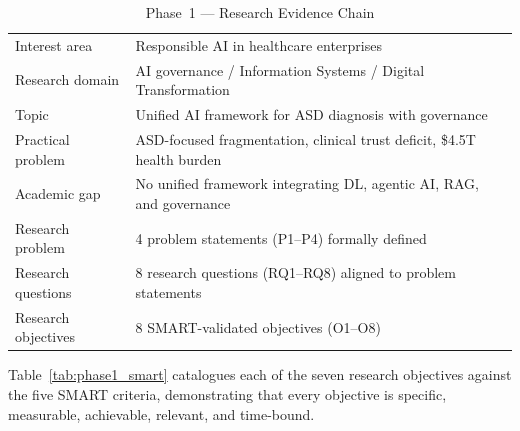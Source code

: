 \begingroup\singlespacing\tablefontsize\tablestripes
\begin{xltabular}{\textwidth}{@{} p{3.2cm} X @{}}
\caption{Phase~1 --- Research Evidence Chain}
\label{tab:phase1_evidence}\\
\toprule
{} &  \\
\midrule
\endfirsthead
\endhead
\bottomrule
\endlastfoot
Interest area            & Responsible AI in healthcare enterprises \\
\addlinespace
Research domain          & AI governance / Information Systems / Digital Transformation \\
\addlinespace
Topic                    & Unified AI framework for ASD diagnosis with governance \\
\addlinespace
Practical problem        & ASD-focused fragmentation, clinical trust deficit, \$4.5T health burden \\
\addlinespace
Academic gap             & No unified framework integrating DL, agentic AI, RAG, and governance \\
\addlinespace
Research problem         & 4 problem statements (P1--P4) formally defined \\
\addlinespace
Research questions       & 8 research questions (RQ1--RQ8) aligned to problem statements \\
\addlinespace
Research objectives      & 8 SMART-validated objectives (O1--O8) \\
\end{xltabular}
\endgroup

\vspace{1.5em}

Table~\ref{tab:phase1_smart} catalogues each of the seven research objectives against the five SMART criteria, demonstrating that every objective is specific, measurable, achievable, relevant, and time-bound.

